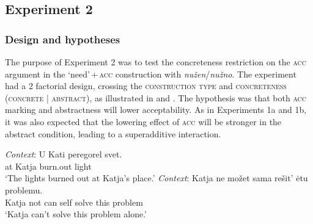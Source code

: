 \documentclass[output=paper]{langscibook}
\begin{document}
\subsection{Experiment 2}

\subsubsection{Design and hypotheses}

The purpose of Experiment 2 was to test the concreteness restriction on the \textsc{acc} argument in the `need'\,+\,\textsc{acc} construction with \textit{nužen}/\textit{nužno}. The experiment had a 2 factorial design, crossing the \textsc{construction type} and \textsc{concreteness} (\textsc{concrete} | \textsc{abstract}), as illustrated in  and . The hypothesis was that both \textsc{acc} marking and abstractness will lower acceptability. As in Experiments 1a and 1b, it was also expected that the lowering effect of \textsc{acc} will be stronger in the abstract condition, leading to a superadditive interaction.

\ea \gll \textit{Context}: U Kati peregorel svet. \label{materials-exp2-anim}\\
{} at Katja burn.out light\\
\glt \hspace{1.3cm} `The lights burned out at Katja's place.'
\z \ex \gll \textit{Context}: Katja ne možet sama rešit' ėtu problemu. \label{materials-exp2-inan}\\
{} Katja not can self solve this problem\\
\glt \hspace{1.3cm} `Katja can't solve this problem alone.'
\z\z
\end{document}
